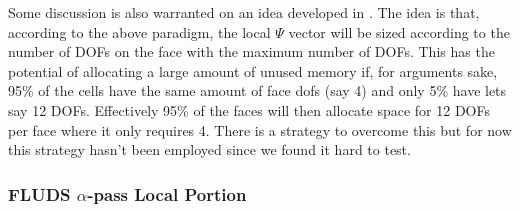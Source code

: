 \documentclass[11pt,letterpaper,titlepage]{article}
\numberwithin{equation}{section}
\begin{document}
Some discussion is also warranted on an idea developed in \cite{AdamsSPDS}. The idea is that, according to the above paradigm, the local $\Psi$ vector will be sized according to the number of DOFs on the face with the maximum number of DOFs. This has the potential of allocating a large amount of unused memory if, for arguments sake, 95\% of the cells have the same amount of face dofs (say 4) and only 5\% have lets say 12 DOFs. Effectively 95\% of the faces will then allocate space for 12 DOFs per face where it only requires 4. There is a strategy to overcome this but for now this strategy hasn't been employed since we found it hard to test.


\vspace{0.25cm}
\subsubsection{FLUDS $\alpha$-pass Local Portion} 
\end{document}
